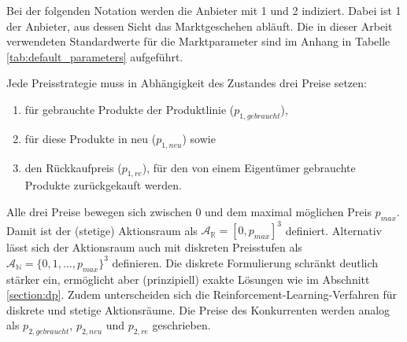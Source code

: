 Bei der folgenden Notation werden die Anbieter mit 1 und 2 indiziert.
Dabei ist 1 der Anbieter, aus dessen Sicht das Marktgeschehen abläuft.
Die in dieser Arbeit verwendeten Standardwerte für die Marktparameter sind im Anhang in Tabelle \ref{tab:default_parameters} aufgeführt.

Jede Preisstrategie muss in Abhängigkeit des Zustandes drei Preise setzen:
\begin{enumerate}
	\item für gebrauchte Produkte der Produktlinie ($p_{1, gebraucht}$),
	\item für diese Produkte in neu ($p_{1, neu}$) sowie
	\item den Rückkaufpreis ($p_{1, re}$), für den von einem Eigentümer gebrauchte Produkte zurückgekauft werden.
\end{enumerate}
Alle drei Preise bewegen sich zwischen 0 und dem maximal möglichen Preis $p_{max}$.
Damit ist der (stetige) Aktionsraum als $\mathcal{A}_\mathbb{R}=[0, p_{max}]^3$ definiert.
Alternativ lässt sich der Aktionsraum auch mit diskreten Preisstufen als $\mathcal{A}_\mathbb{N}=\{0, 1, \ldots, p_{max}\}^3$ definieren.
Die diskrete Formulierung schränkt deutlich stärker ein, ermöglicht aber (prinzipiell) exakte Lösungen wie im Abschnitt \ref{section:dp}.
Zudem unterscheiden sich die Reinforcement-Learning-Verfahren für diskrete und stetige Aktionsräume.
Die Preise des Konkurrenten werden analog als $p_{2, gebraucht}$, $p_{2, neu}$ und $p_{2, re}$ geschrieben.

